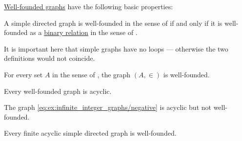 \begin{proposition}\label{thm:def:well_founded_graph}
  \hyperref[def:well_founded_graph]{Well-founded graphs} have the following basic properties:
  \begin{thmenum}
     A simple directed graph is well-founded in the sense of  if and only if it is well-founded as a \hyperref[def:binary_relation]{binary relation} in the sense of .

    It is important here that simple graphs have no loops --- otherwise the two definitions would not coincide.

     For every set \( A \) in the sense of \hyperref[def:zfc]{}, the graph \( (A, {\in}) \) is well-founded.

     Every well-founded graph is acyclic.

    The graph \eqref{eq:ex:infinite_integer_graphs/negative} is acyclic but not well-founded.

     Every finite acyclic simple directed graph is well-founded.
  \end{thmenum}
\end{proposition}
